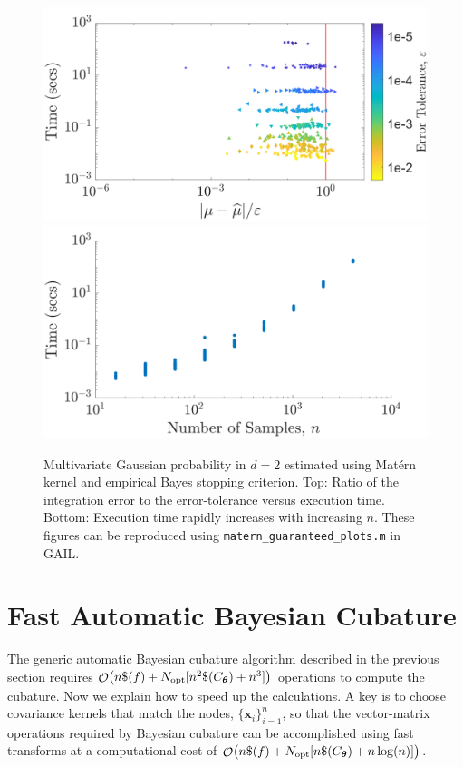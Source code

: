 \documentclass[twocolumn]{svjour3}          %
\DeclareMathOperator{\Order}{{\mathcal O}}
\newcommand{\bm}[1]{\boldsymbol{#1}}
\newcommand{\vtheta}{{\bm{\theta}}}
\newcommand{\vx}{\bm{x}}
\newcommand{\opt}{{\textup{opt}}}
\newcommand{\code}[1]{\texttt{#1}}
\begin{document}
\begin{figure}
	\centering
		\includegraphics[width=0.95\linewidth]{MVN_guaranteed_time_Matern_d2_2019-Jun-29}
	\centering
		\includegraphics[width=0.95\linewidth]{MVN_rapid_n_vs_time_Matern_d2_2019-Jun-29}
	\caption{Multivariate Gaussian probability in $d=2$ estimated using Mat\'ern kernel and empirical Bayes stopping criterion. Top: Ratio of the integration error to the error-tolerance versus execution time. Bottom: Execution time rapidly increases with increasing $n$. These figures can be reproduced using \code{matern\_guaranteed\_plots.m} in GAIL.}
	\label{fig:MVN_Metern_d2b2}
\end{figure}

\section{Fast Automatic Bayesian Cubature}\label{sec:fast_BC}

The generic automatic Bayesian cubature algorithm described in the previous section requires $\Order\bigl(n \$(f) + \linebreak[4] N_{\opt} [n^2 \$(C_\vtheta)  + n^3]\bigr)$ operations to compute the cubature. Now we explain how to speed up the calculations. A key is to choose covariance kernels that match the nodes, $\{\vx_i\}_{i=1}^n$, so that the vector-matrix operations required by Bayesian cubature can be accomplished using fast transforms at a computational cost of $\Order\bigl(n \$(f) + N_{\opt} [n \$(C_\vtheta)  + n \log(n)] \bigr)$.
\end{document}
